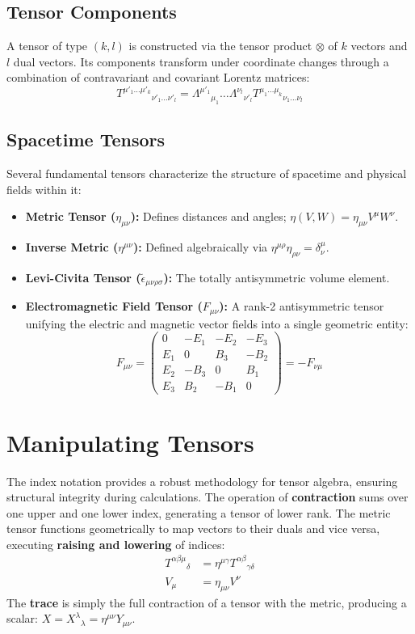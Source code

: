 \documentclass[11pt, a4paper]{report}
\begin{document}
\subsection*{Tensor Components}
A tensor of type $(k, l)$ is constructed via the tensor product $\otimes$ of $k$ vectors and $l$ dual vectors. Its components transform under coordinate changes through a combination of contravariant and covariant Lorentz matrices:
\begin{equation}
{T^{\mu'_1 \dots \mu'_k}}_{\nu'_1 \dots \nu'_l} = {\Lambda^{\mu'_1}}_{\mu_1} \dots {\Lambda^{\nu_l}}_{\nu'_l} {T^{\mu_1 \dots \mu_k}}_{\nu_1 \dots \nu_l}
\end{equation}

\subsection*{Spacetime Tensors}
Several fundamental tensors characterize the structure of spacetime and physical fields within it:
\begin{itemize}
\item \textbf{Metric Tensor ($\eta_{\mu\nu}$):} Defines distances and angles; $\eta(V, W) = \eta_{\mu\nu}V^\mu W^\nu$.
\item \textbf{Inverse Metric ($\eta^{\mu\nu}$):} Defined algebraically via $\eta^{\mu\rho}\eta_{\rho\nu} = \delta^\mu_\nu$.
\item \textbf{Levi-Civita Tensor ($\tilde{\epsilon}_{\mu\nu\rho\sigma}$):} The totally antisymmetric volume element.
\item \textbf{Electromagnetic Field Tensor ($F_{\mu\nu}$):} A rank-2 antisymmetric tensor unifying the electric and magnetic vector fields into a single geometric entity:
\begin{equation}\label{eq:EM Field Tensor}
F_{\mu\nu} =
\begin{pmatrix}
0 & -E_1 & -E_2 & -E_3 \\
E_1 & 0 & B_3 & -B_2 \\
E_2 & -B_3 & 0 & B_1 \\
E_3 & B_2 & -B_1 & 0
\end{pmatrix}
= -F_{\nu\mu}
\end{equation}
\end{itemize}

\section{Manipulating Tensors}
The index notation provides a robust methodology for tensor algebra, ensuring structural integrity during calculations. The operation of \textbf{contraction} sums over one upper and one lower index, generating a tensor of lower rank. The metric tensor functions geometrically to map vectors to their duals and vice versa, executing \textbf{raising and lowering} of indices:
\begin{align}
{T^{\alpha\beta\mu}}_\delta &= \eta^{\mu\gamma} {T^{\alpha\beta}}_{\gamma\delta} \\
V_\mu &= \eta_{\mu\nu}V^\nu
\end{align}
The \textbf{trace} is simply the full contraction of a tensor with the metric, producing a scalar: $X = {X^\lambda}_\lambda = \eta^{\mu\nu}Y_{\mu\nu}$.
\end{document}
